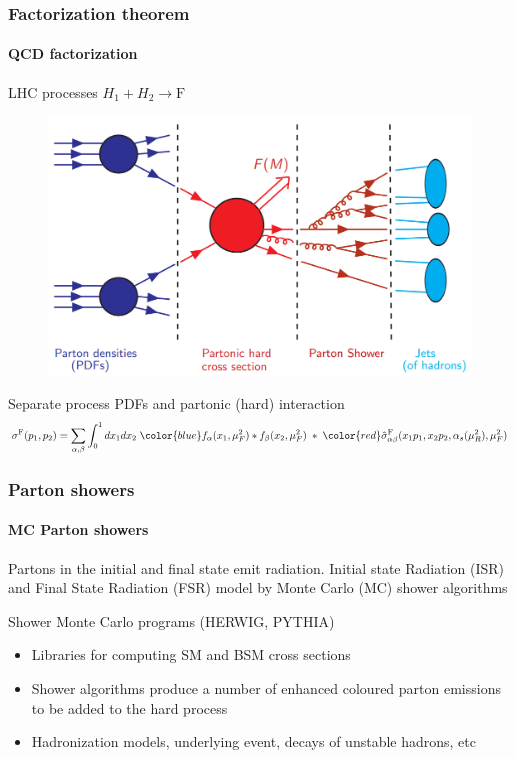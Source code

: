 \documentclass[aspectratio=43]{beamer}
\begin{document}
\begin{frame}

	\frametitle{Factorization theorem}
	\framesubtitle{QCD factorization}
	
	\center \footnotesize LHC processes $H_{1} + H_{2} \rightarrow \textrm{F}$	
	\begin{figure}
		\includegraphics[width = 7 cm]{plots/factorization_1.png}
	\end{figure}
	
	\footnotesize {Separate process {\color{blue}PDFs} and {\color{red} partonic (hard) interaction}	
	\begin{equation}
		\sigma^{\textrm{F}}(p_{1}, p_{2}) = \sum_{\alpha, \beta}
		\int_{0}^{1} dx_{1} dx_{2} \; {\color{blue} f_{\alpha}(x_{1}, \mu_{F}^{2}) \ast f_{\beta}(x_{2}, \mu_{F}^{2})}
		\; \ast \;  
		{\color{red}\hat{\sigma}^{\textrm{F}}_{\alpha \beta}(x_{1}p_{1}, x_{2}p_{2}, \alpha_{s}(\mu_{R}^{2}), \mu_{F}^{2})} \nonumber
	\end{equation}}
		
\end{frame}

\begin{frame}

	\frametitle{Parton showers}
	\framesubtitle{MC Parton showers}
	
	\footnotesize Partons in the initial and final state emit radiation. Initial state Radiation (ISR) and Final State Radiation (FSR) model by Monte Carlo (MC) shower algorithms
	
	\vspace{0.1 cm}
	\center \color{red} Shower Monte Carlo programs (HERWIG, PYTHIA)
	\vspace{0.15 cm}
	
	\begin{itemize} 
		\item Libraries for computing SM and BSM cross sections
		\item Shower algorithms produce a number of enhanced
		coloured parton emissions \\
		to be added to the hard process
		\item Hadronization models, underlying event, decays of unstable hadrons, etc
	\end{itemize}

\end{frame}
\end{document}
